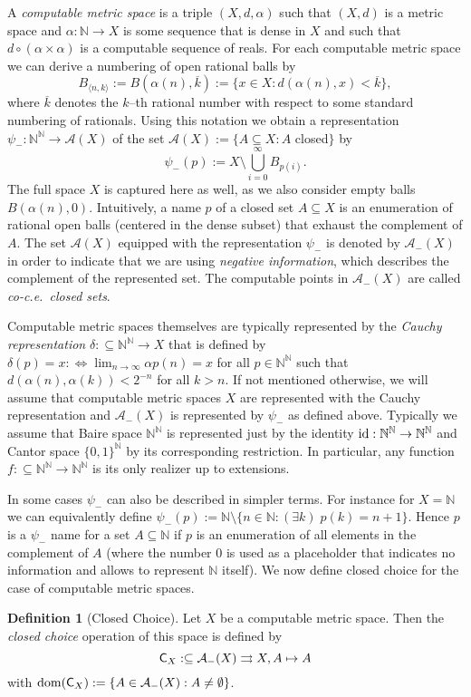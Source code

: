 \documentclass[a4paper]{amsart}
\def\AA{{\mathcal A}}
\def\IN{{\mathbb{N}}}
\def\In{\subseteq}
\def\mto{\rightrightarrows}
\def\id{{\rm id}}
\def\dom{{\rm dom}}
\def\Baire{{\IN^\IN}}
\def\C{\mbox{\rm\sffamily C}}
\theoremstyle{definition}
\newtheorem{definition}[theorem]{Definition}
\begin{document}
A {\em computable metric space} is a triple $(X,d,\alpha)$ such that $(X,d)$ is a metric
space and $\alpha:\IN\to X$ is some sequence that is dense in $X$ and such that
$d\circ(\alpha\times\alpha)$ is a computable sequence of reals. 
For each computable metric space we can derive a numbering of open rational balls by
\[B_{\langle n,k\rangle}:=B(\alpha(n),\overline{k}):=\{x\in X:d(\alpha(n),x)<\overline{k}\},\]
where $\overline{k}$ denotes the $k$--th rational number with respect to some standard numbering of rationals.
Using this notation we obtain a representation $\psi_-:\Baire\to\AA(X)$ of the set $\AA(X):=\{A\In X:A$ closed$\}$ by
\[\psi_-(p):=X\setminus\bigcup_{i=0}^\infty B_{p(i)}.\]
The full space $X$ is captured here as well, as we also consider empty balls $B(\alpha(n),0)$.
Intuitively, a name $p$ of a closed set $A\In X$ is an enumeration of rational open balls (centered in the dense subset)
that exhaust the complement of $A$.
The set $\AA(X)$ equipped with the representation $\psi_-$ is denoted by $\AA_-(X)$ in order to indicate
that we are using {\em negative information}, which describes the complement of the represented set.
The computable points in $\AA_-(X)$ are called {\em co-c.e.\ closed sets}.

Computable metric spaces themselves are typically represented by the {\em Cauchy representation}
$\delta:\In\Baire\to X$ that is defined by $\delta(p)=x:\iff\lim_{n\to\infty}\alpha p(n)=x$ for all $p\in\Baire$
such that $d(\alpha(n),\alpha(k))<2^{-n}$ for all $k>n$. 
If not mentioned otherwise, we will assume that computable metric spaces $X$ are represented
with the Cauchy representation and $\AA_-(X)$ is represented by $\psi_-$ as defined above.
Typically we assume that Baire space $\IN^\IN$ is represented just by the identity $\id:\Baire\to\Baire$
and Cantor space $\{0,1\}^\IN$ by its corresponding restriction. In particular, any function $f:\In\Baire\to\Baire$
is its only realizer up to extensions.

In some cases $\psi_-$ can also be described in simpler terms. For instance for $X=\IN$ we can equivalently
define $\psi_-(p):=\IN\setminus\{n\in\IN:(\exists k)\;p(k)=n+1\}$.
Hence $p$ is a $\psi_-$ name for a set $A\In\IN$ if $p$ is an enumeration of all elements in the complement of $A$
(where the number $0$ is used as a placeholder that indicates no information and allows to represent $\IN$ itself).
We now define closed choice for the case of computable metric spaces.

\begin{definition}[Closed Choice]
Let $X$ be a computable metric space. Then the {\em closed choice} operation
of this space is defined by
\[\C_X:\In\AA_-(X)\mto X,A\mapsto A\]
with $\dom(\C_X):=\{A\in\AA_-(X):A\not=\emptyset\}$.
\end{definition}
\end{document}
